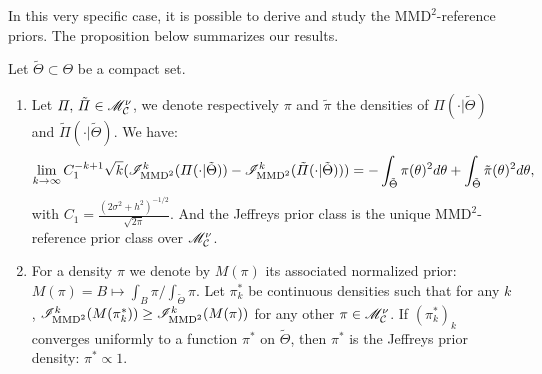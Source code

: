    In this very specific case, it is possible to derive and study the $\text{MMD}^2$-reference priors. The proposition below summarizes our results.
    
    \begin{prop}
        Let $\tilde\Theta\subset\Theta$ be a compact set. 
        \begin{enumerate}
            \item Let $\varPi,\,\tilde\varPi\in\mathscr{M}^\nu_{\mathcal{C}}$, we denote respectively $\pi$ and $\tilde\pi$ the densities of $\varPi(\cdot|\tilde\Theta)$ and $\tilde\varPi(\cdot|\tilde\Theta)$. We have:
            \begin{equation}
                \lim_{k\rightarrow\infty} C_1^{-k+1}\sqrt{k}(\mathscr{I}_{\text{MMD}^2}^k(\varPi(\cdot|\tilde\Theta))-\mathscr{I}_{\text{MMD}^2}^k(\tilde\varPi(\cdot|\tilde\Theta)) ) = -\int_{\tilde\Theta}\pi(\theta)^2d\theta + \int_{\tilde\Theta}\tilde\pi(\theta)^2d\theta,
            \end{equation}
            with $C_1=\frac{(2\sigma^2+h^2)^{-1/2}}{\sqrt{2\pi}}$.
            And the Jeffreys prior class is the unique $\text{MMD}^2$-reference prior class over $\mathscr{M}^\nu_{\mathcal{C}}$.
            \item For a density $\pi$ %
            we denote by $M(\pi)$ its associated normalized prior: $M(\pi)=B\mapsto\int_B\pi/\int_{\tilde\Theta}\pi$.
            Let $\pi^\ast_k$ be continuous densities such that for any $k$, $\mathscr{I}_{\text{MMD}^2}^k(M(\pi^\ast_k))\geq \mathscr{I}_{\text{MMD}^2}^k(M(\pi))$ for any other  $\pi\in\mathscr{M}^\nu_{\mathcal{C}}$.
            If $(\pi^\ast_k)_k$ converges uniformly to a function $\pi^\ast$ on $\tilde\Theta$, then $\pi^\ast$ is the Jeffreys prior density: $\pi^\ast\propto1$.
        \end{enumerate}
    \end{prop}

